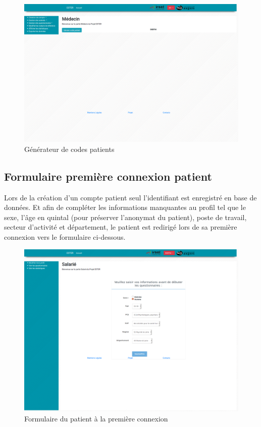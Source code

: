 \begin{figure}[H]
    \begin{center}
	\includegraphics[scale=0.25]{img/connexion/medecin}
    \end{center}
    \caption{Générateur de codes patients}
\end{figure}

\subsection{Formulaire première connexion patient}

Lors de la création d’un compte patient seul l’identifiant est enregistré en base de données. Et afin de compléter les informations manquantes au profil tel que le sexe, l’âge en quintal (pour préserver l’anonymat du patient), poste de travail, secteur d’activité et département, le patient est redirigé lors de sa première connexion vers le formulaire ci-dessous.

\begin{figure}[H]
    \begin{center}
	\includegraphics[scale=0.25]{img/connexion/formPatient}
    \end{center}
    \caption{Formulaire du patient à la première connexion}
\end{figure}